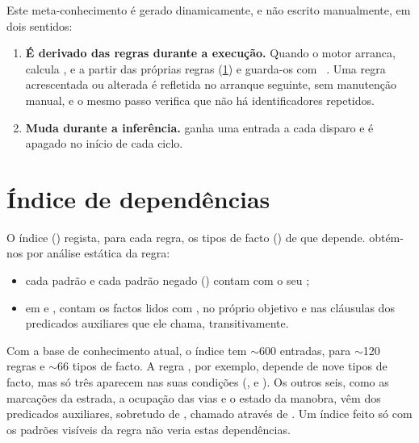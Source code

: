 Este meta-conhecimento é gerado dinamicamente, e não escrito manualmente, em dois sentidos:

\begin{enumerate}
  \item \textbf{É derivado das regras durante a execução.} Quando o motor
    arranca,  calcula ,
     e  a partir das próprias regras
    (\cref{sec:meta-indice}) e guarda-os com ~\cite{swidynamic}.
    Uma regra acrescentada ou alterada é refletida no arranque seguinte, sem
    manutenção manual, e o mesmo passo verifica que não há identificadores
    repetidos.
  \item \textbf{Muda durante a inferência.}  ganha uma entrada a
    cada disparo e é apagado no início de cada ciclo.
\end{enumerate}

\section{Índice de dependências}
\label{sec:meta-indice}

O índice () regista, para cada regra, os tipos de facto
() de que depende.  obtém-nos por análise
estática da regra:

\begin{itemize}
  \item cada padrão e cada padrão negado () contam com o seu
    ;
  \item em  e , contam os factos lidos com
    , no próprio objetivo e nas cláusulas dos predicados auxiliares
    que ele chama, transitivamente.
\end{itemize}

Com a base de conhecimento atual, o índice tem $\sim$600 entradas, para $\sim$120
regras e $\sim$66 tipos de facto. A regra
, por
exemplo, depende de nove tipos de facto, mas só três aparecem nas suas condições
(,  e ). Os outros seis, como as
marcações da estrada, a ocupação das vias e o estado da manobra, vêm dos
predicados auxiliares, sobretudo de , chamado através
de . Um índice feito só com os padrões visíveis da regra não veria
estas dependências.

